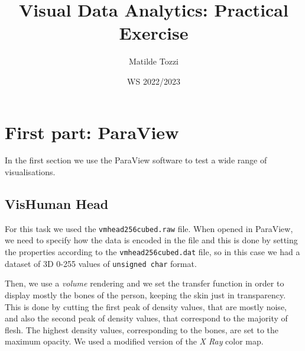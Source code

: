 \documentclass[openany]{article}
\title{Visual Data Analytics: Practical Exercise}
\date{WS 2022/2023}
\author{Matilde Tozzi}
\begin{document}
\maketitle

\section {First part: ParaView}

In the first section we use the ParaView software to test a wide range of visualisations.

\subsection {VisHuman Head}

For this task we used the \texttt{vmhead256cubed.raw} file. When opened in ParaView, we need to specify how the data is encoded in the file and this is done by setting the properties according to the \texttt{vmhead256cubed.dat} file, so in this case we had a dataset of 3D 0-255 values of \texttt{unsigned char} format.

Then, we use a \textit{volume} rendering and we set the transfer function in order to display mostly the bones of the person, keeping the skin just in transparency. This is done by cutting the first peak of density values, that are mostly noise, and also the second peak of density values, that correspond to the majority of flesh. The highest density values, corresponding to the bones, are set to the maximum opacity. We used a modified version of the \textit{X Ray} color map.
\end{document}
